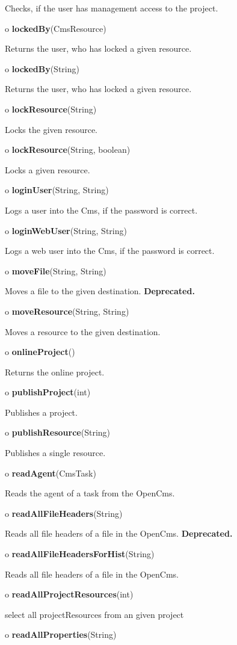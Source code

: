\begin{description}
Checks, if the user has management access to the project.
\item o {\bf lockedBy}(CmsResource)

Returns the user, who has locked a given resource.
\item o {\bf lockedBy}(String)

Returns the user, who has locked a given resource.
\item o {\bf lockResource}(String)

Locks the given resource.
\item o {\bf lockResource}(String, boolean)

Locks a given resource.
\item o {\bf loginUser}(String, String)

Logs a user into the Cms, if the password is correct.
\item o {\bf loginWebUser}(String, String)

Logs a web user into the Cms, if the password is correct.
\item o {\bf moveFile}(String, String)

Moves a file to the given destination. {\bf Deprecated.}
\item o {\bf moveResource}(String, String)

Moves a resource to the given destination.
\item o {\bf onlineProject}()

Returns the online project.
\item o {\bf publishProject}(int)

Publishes a project.
\item o {\bf publishResource}(String)

Publishes a single resource.
\item o {\bf readAgent}(CmsTask)

Reads the agent of a task from the OpenCms.
\item o {\bf readAllFileHeaders}(String)

Reads all file headers of a file in the OpenCms. {\bf Deprecated.}
\item o {\bf readAllFileHeadersForHist}(String)

Reads all file headers of a file in the OpenCms.
\item o {\bf readAllProjectResources}(int)

select all projectResources from an given project
\item o {\bf readAllProperties}(String)


\end{description}
